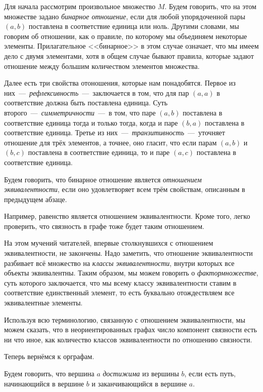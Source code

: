 	Для начала рассмотрим произвольное множество $M$. Будем говорить, что на этом множестве задано \emph{бинарное отношение}, 
	если для любой упорядоченной пары $(a, b)$ поставлена в соответствие единица или ноль. Другими словами, мы говорим об 
	отношении, как о правиле, по которому мы объединяем некоторые элементы. Прилагательное <<бинарное>> в этом случае означает, 
	что мы имеем дело с двумя элементами, хотя в общем случае бывают правила, которые задают отношение между 
	большим количеством элементов множества.
	
	Далее есть три свойства отоношения, которые нам понадобятся. Первое из них~---~\emph{рефлексивность}~---~заключается в том, 
	что для пар $(a, a)$ в соответствие должна быть поставлена единица. Суть второго~---~\emph{симметричности}~---~в том, что паре $(a, b)$ 
	поставлена в соответствие единица тогда и только тогда, когда и паре $(b, a)$ поставлена в соответствие единица. 
	Третье из них~---~\emph{транзитивность}~---~уточняет отношение для трёх элементов, а точнее, оно гласит, 
	что если парам $(a, b)$ и $(b, c)$ поставлена в соответствие единица, то и паре $(a, c)$ поставлена в соответствие единица.
	
	Будем говорить, что бинарное отношение является \emph{отношением эквивалентности}, 
	если оно удовлетворяет всем трём свойствам, описанным в предыдущем абзаце.
	
	Например, равенство является отношением эквивалентности. Кроме того, легко проверить, что связность в графе тоже будет таким отношением. 
	
	На этом мучений читателей, впервые столкнувшихся с отношением эквивалентности, не закончены. 
	Надо заметить, что отношение эквивалентности разбивает всё множество на \emph{классы эквивалентности}, 
	внутри которых все объекты эквивалентны. Таким образом, мы можем говорить о \emph{фактормножестве}, 
	суть которого заключается, что мы всему классу эквивалентности ставим в соответствие единственный элемент, 
	то есть буквально отождествляем все эквивалентные элементы.
	
	Используя всю терминологию, связанную с отношением эквивалентности, мы можем сказать, что в 
	неориентированных графах число компонент связности есть ни что иное, как количество классов эквивалентности по отношению связности.

	Теперь вернёмся к орграфам. 	
	

\begin{definition}
	Будем говорить, что вершина $a$ \emph{достижима} из вершины $b$, если есть путь, начинающийся в вершине $b$ и 
	заканчивающийся в вершине $a$.	
\end{definition}	 
	
